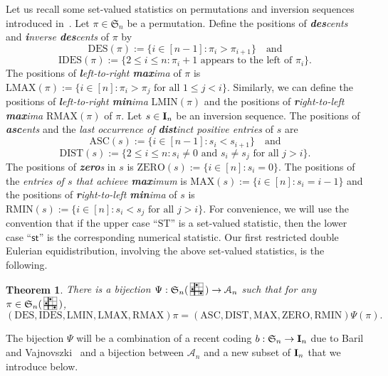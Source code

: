 \documentclass[12pt]{amsart}
\newcounter{mycount}
\theoremstyle{plain}
\newtheorem{theorem}[mycount]{Theorem}
\theoremstyle{definition}
\theoremstyle{example}
\theoremstyle{remark}
\numberwithin{equation}{section}
\numberwithin{figure}{section}
\def\A{\mathcal{A}}
\def\I{\operatorname{{\bf I}}}
\def\IDES{\mathrm{IDES}}
\def\DES{\mathrm{DES}}
\def\RMAX{\mathrm{RMAX}}
\def\LMAX{\mathrm{LMAX}}
\def\LMIN{\mathrm{LMIN}}
\def\DIST{\mathrm{DIST}}
\def\ASC{\mathrm{ASC}}
\def\RMIN{\mathrm{RMIN}}
\def\ZERO{\mathrm{ZERO}}
\def\MAX{\mathrm{MAX}}
\def\ST{\mathrm{ST}}
\def\S{\mathfrak{S}}
\def\st{\mathsf{st}}
\newcommand{\SEPATTERN}{
    \draw[step=1, xshift=14pt, yshift=14pt, \cfill, line cap=round] (0,0) grid (3,3);
    \draw[step=1, xshift=14pt, yshift=14pt, thick] (0,1) -- (3,1);
    \draw[step=1, xshift=14pt, yshift=14pt, thick] (1,0) -- (1,3);
    \foreach \x/\y in {1/2,2/3,3/1} \node[disc, fill=black] at (\x,\y) {};
}
\newcommand{\sepattern}{\!\raisebox{-0.3em}{
  \begin{tikzpicture}[line width=0.7pt, scale=0.15]
    \tikzstyle{disc} = [circle,thin,draw=black, minimum size=1.7pt, inner sep=0pt ]
    \SEPATTERN
  \end{tikzpicture}}
}
\newcommand{\cfill}{black!40}
\begin{document}
Let us recall some set-valued statistics on permutations and inversion sequences introduced in~\cite{bv,kl}. Let $\pi\in\S_n$ be a permutation. Define the positions of {\em {\bf\em des}cents} and  {\em {\bf\em i}nverse {\bf\em des}cents} of $\pi$ by
$$
\DES(\pi):=\{i\in[n-1]: \pi_i>\pi_{i+1}\}\quad\text{and}
$$
$$
\IDES(\pi):=\{2\leq i\leq n: \pi_i+1\text{ appears to the left of $\pi_i$}\}.
$$
The positions of {\em {\bf\em l}eft-to-right {\bf\em max}ima} of $\pi$ is $\LMAX(\pi):=\{i\in[n]:\pi_i>\pi_j\,\, \text{for all $1\leq j<i$}\}$. Similarly, we can define the  positions of {\em{\bf\em l}eft-to-right {\bf\em min}ima} $\LMIN(\pi)$ and  the positions of {\em {\bf\em r}ight-to-left {\bf\em max}ima} $\RMAX(\pi)$  of $\pi$.
Let $s\in\I_n$ be an inversion sequence. The positions of {\em {\bf\em asc}ents} and the {\em last occurrence of {\bf\em  dist}inct positive entries} of $s$ are
$$
\ASC(s):=\{i\in[n-1]: s_i<s_{i+1}\}\quad\text{and}
$$
$$
\DIST(s):=\{2\leq i\leq n: s_i\neq0\text{ and $s_i\neq s_j$ for all $j>i$}\}.
$$
The positions of {\em {\bf\em zero}s} in $s$ is $\ZERO(s):=\{i\in[n]: s_i=0\}$. The positions of the {\em entries of $s$ that achieve {\bf\em max}imum} is $\MAX(s):=\{i\in[n]: s_i=i-1\}$ and the positions of  {\em {\bf\em r}ight-to-left {\bf\em min}ima}  of $s$ is $\RMIN(s):=\{i\in[n]: s_i<s_j\text{ for all $j>i$}\}$. For convenience, we will use the convention that if the upper case ``$\ST$'' is a set-valued statistic, then the lower case ``$\st$'' is the corresponding numerical statistic.
Our first restricted double Eulerian equidistribution, involving the above set-valued statistics, is the following.

 \begin{theorem}\label{mainth}
 There is  a bijection $\Psi: \S_n(\sepattern\,)\rightarrow\mathcal{A}_n$  such  that  for any $\pi\in\S_n(\sepattern\,)$,
 $$
 (\DES, \IDES, \LMIN,  \LMAX, \RMAX)\pi=(\ASC, \DIST, \MAX,  \ZERO, \RMIN)\Psi(\pi).
 $$
 \end{theorem}



The bijection $\Psi$ will be a combination of a recent coding $b: \S_n\rightarrow\I_n$ due to Baril and Vajnovszki~\cite{bv} and a  bijection between $\A_n$ and a new subset of $\I_n$ that we introduce below.
\end{document}
